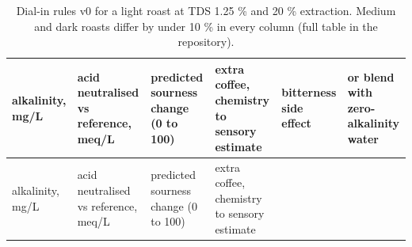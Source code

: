 \documentclass[
  a4paper,
]{article}
\begin{document}
\begin{longtable}[]{@{}
  >{\raggedright\arraybackslash}p{}
  >{\raggedright\arraybackslash}p{}
  >{\raggedright\arraybackslash}p{}
  >{\raggedright\arraybackslash}p{}
  >{\raggedright\arraybackslash}p{}
  >{\raggedright\arraybackslash}p{}@{}}
\caption{Dial-in rules v0 for a light roast at TDS 1.25 \% and 20 \%
extraction. Medium and dark roasts differ by under 10 \% in every column
(full table in the repository).}\label{tbl-rules}\tabularnewline
\toprule\noalign{}
\begin{minipage}[b]{\linewidth}\raggedright
alkalinity, mg/L
\end{minipage} & \begin{minipage}[b]{\linewidth}\raggedright
acid neutralised vs reference, meq/L
\end{minipage} & \begin{minipage}[b]{\linewidth}\raggedright
predicted sourness change (0 to 100)
\end{minipage} & \begin{minipage}[b]{\linewidth}\raggedright
extra coffee, chemistry to sensory estimate
\end{minipage} & \begin{minipage}[b]{\linewidth}\raggedright
bitterness side effect
\end{minipage} & \begin{minipage}[b]{\linewidth}\raggedright
or blend with zero-alkalinity water
\end{minipage} \\
\midrule\noalign{}
\endfirsthead
\toprule\noalign{}
\begin{minipage}[b]{\linewidth}\raggedright
alkalinity, mg/L
\end{minipage} & \begin{minipage}[b]{\linewidth}\raggedright
acid neutralised vs reference, meq/L
\end{minipage} & \begin{minipage}[b]{\linewidth}\raggedright
predicted sourness change (0 to 100)
\end{minipage} & \begin{minipage}[b]{\linewidth}\raggedright
extra coffee, chemistry to sensory estimate
\end{minipage} & \begin{minipage}[b]{\linewidth}\raggedright

\end{minipage}
\end{longtable}
\end{document}
